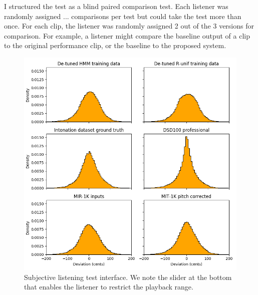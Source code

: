 I structured the test as a blind paired comparison test. Each listener was randomly assigned ... comparisons per test but could take the test more than once. For each clip, the listener was randomly assigned 2 out of the 3 versions for comparison. For example, a listener might compare the baseline output of a clip to the original performance clip, or the baseline to the proposed system. 

\begin{figure}[t]
    \centering
    \includegraphics[width=\columnwidth]{figures/dataset-comparison.png}
    \caption{Subjective listening test interface. We note the slider at the bottom that enables the listener to restrict the playback range.}
    \label{fig:listening-test-ide}
\end{figure}


